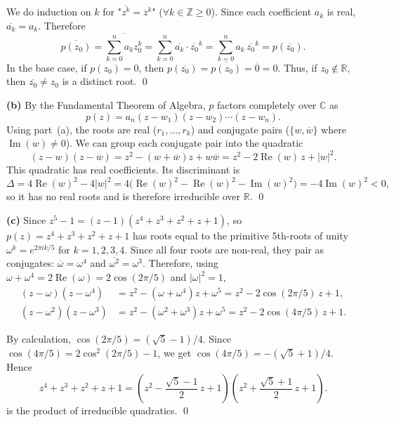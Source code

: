 \documentclass[a4paper]{article}
\begin{document}
We do induction on $k$ for "$\overline{z^k} = \overline{z}^k$" ($\forall k \in \mathbb{Z} \geq 0$).  Since each coefficient $a_k$ is real, $\overline{a_k} = a_k$.  Therefore
\[
\overline{p(z_0)} = \overline{\sum_{k=0}^n a_k z_0^k} = \sum_{k=0}^n \overline{a_k}\cdot\overline{z_0}^k = \sum_{k=0}^n a_k\,\overline{z_0}^k = p(\overline{z_0}).
\]
In the base case, if $p(z_0) = 0$, then $p(\overline{z_0}) = \overline{p(z_0)} = \overline{0} = 0$.  Thus, if $z_0 \notin \mathbb{R}$, then $\overline{z_0} \neq z_0$ is a distinct root. \qed

\medskip\noindent\textbf{(b)}
By the Fundamental Theorem of Algebra, $p$ factors completely over $\mathbb{C}$ as
\[
p(z) = a_n(z - w_1)(z - w_2)\cdots(z - w_n).
\]
Using part~(a), the roots are real ($r_1, \ldots, r_k$) and conjugate pairs ($\{w, \overline{w}\}$ where $\operatorname{Im}(w) \neq 0$).  We can group each conjugate pair into the quadratic
\[
(z - w)(z - \overline{w}) = z^2 - (w + \overline{w})z + w\overline{w} = z^2 - 2\operatorname{Re}(w)\,z + |w|^2.
\]
This quadratic has real coefficients.  Its discriminant is
\[
\Delta = 4\operatorname{Re}(w)^2 - 4|w|^2 = 4\bigl(\operatorname{Re}(w)^2 - \operatorname{Re}(w)^2 - \operatorname{Im}(w)^2\bigr) = -4\operatorname{Im}(w)^2 < 0,
\]
so it has no real roots and is therefore irreducible over $\mathbb{R}$. \qed

\medskip\noindent\textbf{(c)}
Since $z^5 - 1 = (z-1)(z^4+z^3+z^2+z+1)$, so $p(z) = z^4+z^3+z^2+z+1$ has roots equal to the primitive 5th-roots of unity $\omega^k = e^{2\pi ik/5}$ for $k = 1, 2, 3, 4$.  Since all four roots are non-real, they pair as conjugates: $\overline{\omega} = \omega^4$ and $\overline{\omega^2} = \omega^3$.  Therefore, using $\omega + \omega^4 = 2\operatorname{Re}(\omega) = 2\cos(2\pi/5)$ and $|\omega|^2 = 1$,
\begin{align*}
(z - \omega)(z - \omega^4) &= z^2 - (\omega + \omega^4)z + \omega^5 = z^2 - 2\cos(2\pi/5)\,z + 1, \\[4pt]
(z - \omega^2)(z - \omega^3) &= z^2 - (\omega^2+\omega^3)z + \omega^5 = z^2 - 2\cos(4\pi/5)\,z + 1.
\end{align*}

By calculation, $\cos(2\pi/5) = (\sqrt{5}-1)/4$.  Since $\cos(4\pi/5) = 2\cos^2(2\pi/5)-1$, we get $\cos(4\pi/5) = -(\sqrt{5}+1)/4$.  Hence
\[
z^4+z^3+z^2+z+1 = \left(z^2 - \frac{\sqrt{5}-1}{2}\,z + 1\right)\!\left(z^2 + \frac{\sqrt{5}+1}{2}\,z + 1\right).
\]
is the product of irreducible quadratics. \qed

\newpage
\end{document}
